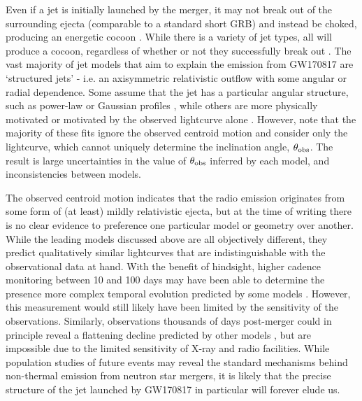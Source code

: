 Even if a jet is initially launched by the merger, it may not break out of the surrounding ejecta (comparable to a standard short GRB) and instead be choked, producing an energetic cocoon \citep{2017ApJ...834...28N,2018MNRAS.479..588G,2018MNRAS.473..576G}. While there is a variety of jet types, all will produce a cocoon, regardless of whether or not they successfully break out \citep{2018MNRAS.478..407N}. The vast majority of jet models that aim to explain the emission from GW170817 are `structured jets' - i.e. an axisymmetric relativistic outflow with some angular or radial dependence. Some assume that the jet has a particular angular structure, such as power-law or Gaussian profiles \citep[e.g.][]{2019NatAs...3..940H,2020arXiv200601150T,2020MNRAS.495.3780N}, while others are more physically motivated \citep[e.g.][]{2018MNRAS.473L.121K,2018ApJ...863...58X} or motivated by the observed lightcurve alone \citep{2020arXiv200713116T}. However, \citet{2020arXiv200501754N} note that the majority of these fits ignore the observed centroid motion and consider only the lightcurve, which cannot uniquely determine the inclination angle, $\theta_{\rm obs}$. The result is large uncertainties in the value of $\theta_{\rm obs}$ inferred by each model, and inconsistencies between models.

The observed centroid motion indicates that the radio emission originates from some form of (at least) mildly relativistic ejecta, but at the time of writing there is no clear evidence to preference one particular model or geometry over another. While the leading models discussed above are all objectively different, they predict qualitatively similar lightcurves that are indistinguishable with the observational data at hand. With the benefit of hindsight, higher cadence monitoring between 10 and 100 days may have been able to determine the presence more complex temporal evolution predicted by some models \citep[e.g.][]{2018PhRvL.120x1103L,2020arXiv200602382M}. However, this measurement would still likely have been limited by the sensitivity of the observations. Similarly, observations thousands of days post-merger could in principle reveal a flattening decline predicted by other models \citep{2020arXiv200601150T}, but are impossible due to the limited sensitivity of X-ray and radio facilities. While population studies of future events may reveal the standard mechanisms behind non-thermal emission from neutron star mergers, it is likely that the precise structure of the jet launched by GW170817 in particular will forever elude us.

